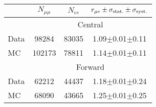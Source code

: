 
\begin{table}[hbtp]
 \renewcommand{\arraystretch}{1.3}
 \setlength{\belowcaptionskip}{6pt}
 \centering
 \caption{
     }
  \label{tab:rMuE}
  \begin{tabular}{l| ccc }

    							& $N_{\mu\mu}$ &  $N_{ee}$ & $r_{\mu e} \pm \sigma_{\text{stat.}} \pm \sigma_{\text{syst.}}$ \\ 
    
    \hline
    							& \multicolumn{3}{c}{Central}  \\ 

    \hline
        Data       &  98284                   & 83035              &  1.09$\pm$0.01$\pm$0.11    \\

        MC       &  102173                   & 78811              &  1.14$\pm$0.01$\pm$0.11    \\

\hline
    							& \multicolumn{3}{c}{Forward}  \\ 

    \hline
        Data       &  62212                   & 44437              &  1.18$\pm$0.01$\pm$0.24    \\

        MC       &  68090                   & 43665              &  1.25$\pm$0.01$\pm$0.25    \\

  \end{tabular}
\end{table}


